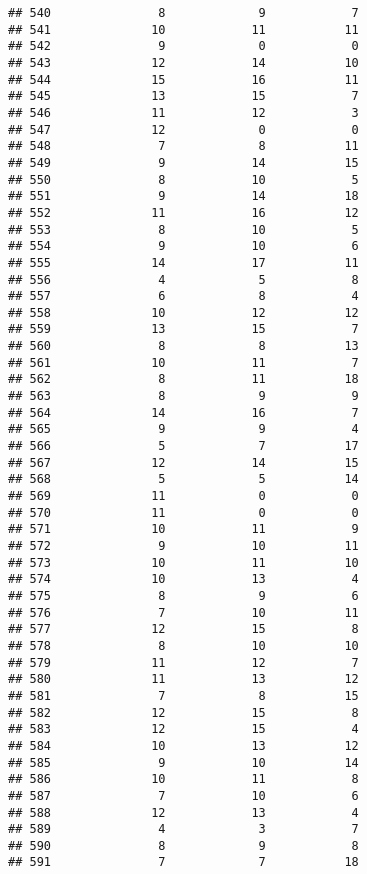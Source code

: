 \documentclass[
]{article}
\begin{document}
\begin{verbatim}
## 540               8             9            7
## 541              10            11           11
## 542               9             0            0
## 543              12            14           10
## 544              15            16           11
## 545              13            15            7
## 546              11            12            3
## 547              12             0            0
## 548               7             8           11
## 549               9            14           15
## 550               8            10            5
## 551               9            14           18
## 552              11            16           12
## 553               8            10            5
## 554               9            10            6
## 555              14            17           11
## 556               4             5            8
## 557               6             8            4
## 558              10            12           12
## 559              13            15            7
## 560               8             8           13
## 561              10            11            7
## 562               8            11           18
## 563               8             9            9
## 564              14            16            7
## 565               9             9            4
## 566               5             7           17
## 567              12            14           15
## 568               5             5           14
## 569              11             0            0
## 570              11             0            0
## 571              10            11            9
## 572               9            10           11
## 573              10            11           10
## 574              10            13            4
## 575               8             9            6
## 576               7            10           11
## 577              12            15            8
## 578               8            10           10
## 579              11            12            7
## 580              11            13           12
## 581               7             8           15
## 582              12            15            8
## 583              12            15            4
## 584              10            13           12
## 585               9            10           14
## 586              10            11            8
## 587               7            10            6
## 588              12            13            4
## 589               4             3            7
## 590               8             9            8
## 591               7             7           18

\end{verbatim}
\end{document}
